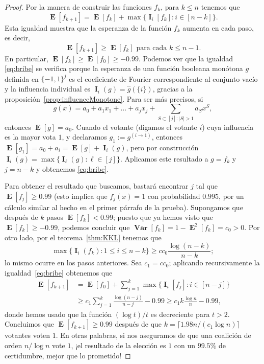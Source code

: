 \documentclass[autocontact]{gaceta}
\DeclareMathOperator{\Var}{\mathbf{Var}}
\DeclareMathOperator{\II}{\mathbf{I}}
\DeclareMathOperator{\EE}{\mathbf{E}}
\begin{document}
\begin{proof}
Por la manera de construir las funciones $f_k$, para $k\leq n$ tenemos que
\begin{equation}\label{eq:bribe}
\EE[f_{k+1}] = \EE[f_k] + \max\{\II_i [f_k]: i\in [n-k]\}.
\end{equation}
Esta igualdad muestra que la esperanza de la función $f_k$ aumenta en cada paso, es decir,
\[
\EE[f_{k+1}] \geq \EE[f_k] \text{ para cada } k\leq n-1.
\]
En particular, $\EE[f_k]\geq \EE[f_0]\geq -0.99$. Podemos ver que la igualdad \eqref{eq:bribe} se verifica porque la esperanza de una función booleana monótona $g$ definida en $\{-1,1\}^j$ es el coeficiente de Fourier correspondiente al conjunto vacío y la influencia individual es $\II_i(g)=\widehat{g}(\{i\})$, gracias a la proposición~\ref{prop:influenceMonotone}. Para ser más precisos, si
\[
   g(x) = a_0+a_1x_1+\dots + a_jx_j +\sum_{S\subset [j] \colon |S|>1} a_Sx^S,
\]
entonces $\EE[g]=a_0$. Cuando el votante (digamos el votante $i$) cuya influencia es la mayor vota $1$, y declaramos $g_1:=g^{(i\to1)}$, entonces $\EE[g_1]=a_0+a_{i}=\EE[g]+\II_{i}(g)$, pero por construcción $\II_{i}(g)= \max\{\II_{\ell} (g): \ell\in [j]\}$. Aplicamos este resultado a $g=f_{k}$ y $j=n-k$ y obtenemos \eqref{eq:bribe}.

Para obtener el resultado que buscamos, bastará encontrar $j$ tal que $\EE[f_j]\geq 0.99$ (esto implica que $f_j(x)=1$ con probabilidad $0.995$, por un cálculo similar al hecho en el primer párrafo de la prueba).
Supongamos que después de $k$ pasos $\EE[f_k]< 0.99$; puesto que ya hemos visto que $\EE[f_k]\geq -0.99$, podemos concluir que $\Var [f_k]=1-\EE^2[f_k]=c_0>0$.
Por otro lado, por el teorema~\ref{thm:KKL} tenemos que
\[
   \max\{\II_i(f_k): 1\leq i\leq n-k\}\geq c c_0 \frac{\log (n-k)}{n-k};
\]
lo mismo ocurre en los pasos anteriores. Sea $c_1= c c_0 $; aplicando recursivamente la igualdad~\eqref{eq:bribe} obtenemos que
\begin{align*}
   \EE[f_{k+1}] &= \EE[f_0] + \sum_{j=1}^k \max\{\II_i [f_j]: i\in [n-j]\}
   \\
   &\geq c_1\sum_{j=1}^k \frac{\log (n-j)}{n-j} -0.99
   \geq c_1 k\frac{\log n}{n} - 0.99,
\end{align*}
donde hemos usado que la función $(\log t)/t$ es decreciente para $t>2$. Concluimos que $\EE[f_{k+1}]\geq 0.99$ después de que $k = \lceil 1.98 n / (c_1\log n)\rceil$ votantes voten $1$. En otras palabras, si nos aseguramos de que una coalición de orden $n/\log n$ vote $1$, ¡el resultado de la elección es $1$ con un $99.5\%$ de certidumbre, mejor que lo prometido!
\end{proof}
\end{document}

